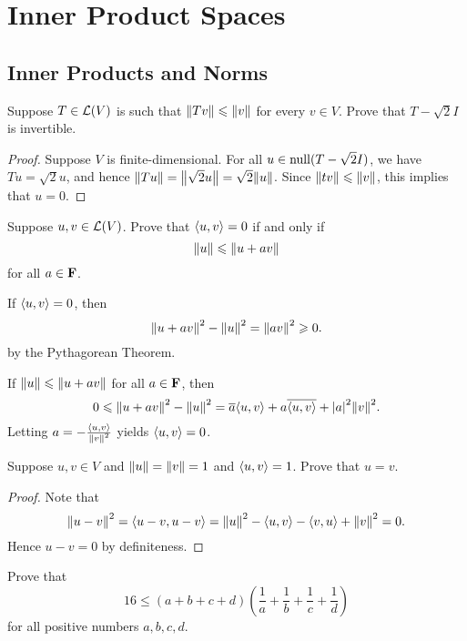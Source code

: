 \chapter{Inner Product Spaces}

\section{Inner Products and Norms}

\begin{exercise}{5}
	Suppose \( T \in \operatorname{\mathcal{L}}(V) \) is such that \(\norm{Tv} \le \norm{v}\) for every \(v \in V\). Prove that \(T-\sqrt{2}I\) is invertible.
\end{exercise}

\begin{proof}
	Suppose \(V\) is finite-dimensional. For all \(u \in \operatorname{null}(T - \sqrt{2}I)\), we have \(Tu = \sqrt{2}u\), and hence \(\norm{Tu} = \norm{\sqrt{2}u} = \sqrt{2}\norm{u}\). Since \(\norm{tv} \le \norm{v}\), this implies that \(u = 0\).
\end{proof}

\begin{exercise}{6}
	Suppose \(u, v \in \operatorname{\mathcal{L}}(V)\). Prove that \(\inp{u}{v} = 0\) if and only if
	\[
		\norm{u} \le \norm{u + av}
	\]
	for all \(a \in \mathbf{F}\).
\end{exercise}

\begin{solution}
	If \(\inp{u}{v} = 0\), then
	\[
		\norm{u + av}^{2} - \norm{u}^{2} = \norm{av}^{2} \ge 0.
	\]
	by the Pythagorean Theorem.

	If \(\norm{u} \le \norm{u + av}\) for all \(a \in \mathbf{F}\), then
	\[
		0 \le \norm{u + av}^{2} - \norm{u}^{2} = \conj{a}\inp{u}{v} + a\conj{\inp{u}{v}} + \abs{a}^{2}\norm{v}^{2}.
	\]
	Letting \(a = -\frac{\inp{u}{v}}{\norm{v}^{2}}\) yields \(\inp{u}{v} = 0\).
\end{solution}

\begin{exercise}{8}
	Suppose \(u, v \in V\) and \(\norm{u} = \norm{v} = 1\) and \(\inp{u}{v} = 1\). Prove that \(u = v\).
\end{exercise}

\begin{proof}
	Note that
	\[
		\norm{u - v}^{2} = \inp{u - v}{u - v} = \norm{u}^{2} - \inp{u}{v} - \inp{v}{u} + \norm{v}^{2} = 0.
	\]
	Hence \(u - v = 0\) by definiteness.
\end{proof}

\begin{exercise}{11}
	Prove that
	\[
		16 \le (a + b + c + d)\left(\frac{1}{a} + \frac{1}{b} + \frac{1}{c} + \frac{1}{d}\right)
	\]
	for all positive numbers \(a, b, c, d\).
\end{exercise}

